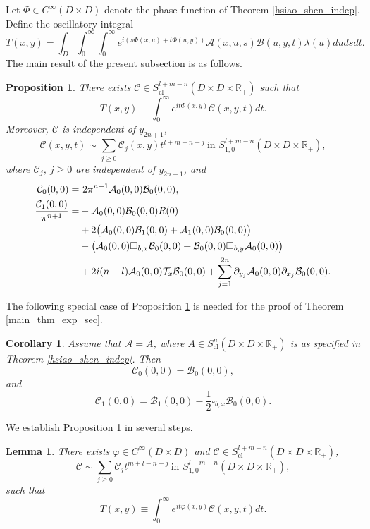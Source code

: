 \documentclass{article}
\newtheorem{lemma}[theorem]{Lemma}
\newtheorem{corollary}[theorem]{Corollary}
\newtheorem{proposition}[theorem]{Proposition}
\newcommand{\RR}{\mathbb R}
\newcommand{\mca}{\mathcal A}
\newcommand{\mcb}{\mathcal B}
\newcommand{\mcc}{\mathcal C}
\newcommand{\mct}{\mathcal T}
\DeclareMathOperator{\cl}{cl}
\begin{document}
Let $\Phi \in C^\infty(D \times D)$ denote the phase function of Theorem \ref{hsiao_shen_indep}. Define the oscillatory integral $$T(x,y) = \int_D \int_0^\infty \int_0^\infty e^{i(s \Phi(x,u) + t \Phi(u, y))} \mca(x,u, s) \mcb(u, y, t) \lambda(u) du ds dt.$$
The main result of the present subsection is as follows.
%
\begin{proposition}\label{product_expansion} There exists $\mcc \in S^{l+m-n}_{\cl}(D \times D \times \RR_+)$ such that $$T(x,y) \equiv \int_0^\infty e^{it \Phi(x,y)} \mcc(x,y,t)dt.$$
Moreover, $\mcc$ is independent of $y_{2n+1}$,
$$\mcc(x,y,t) \sim \sum_{j \ge 0} \mcc_j(x,y) t^{l+m-n-j}\ \text{in } S^{l+m-n}_{1,0}(D \times D \times \RR_+),$$
where $\mcc_j$, $j \ge 0$ are independent of $y_{2n+1}$, and
%
\begin{equation}\label{gen_C0C1}\begin{aligned} \mcc_0(0,0) = &\ 2\pi^{n+1} \mca_0(0,0) \mcb_0(0,0),\\ \frac{\mcc_1(0,0)}{\pi^{n+1}} = &- \mca_0(0,0) \mcb_0(0,0) R(0)\\ & + 2\big{(}\mca_0(0,0) \mcb_1(0,0) + \mca_1(0,0) \mcb_0(0,0) \big{)}\\ & -\big{(}\mca_0(0,0) \square_{b,x} \mcb_0(0,0) + \mcb_0(0,0) \square_{b,y} \mca_0(0,0)\big{)}\\ &+2i(n-l) \mca_0(0,0)\mct_x \mcb_0(0,0) + \sum_{j=1}^{2n} \partial_{y_j} \mca_0(0,0) \partial_{x_j} \mcb_0(0,0). \end{aligned}\end{equation}\end{proposition}
%
The following special case of Proposition \ref{product_expansion} is needed for the proof of Theorem \ref{main_thm_exp_sec}.
%
\begin{corollary}\label{toeplitz_exp} Assume that $\mca = A$, where $A \in S^n_{\cl}(D \times D \times \RR_+)$ is as specified in Theorem \ref{hsiao_shen_indep}. Then$$\mcc_0(0,0) = \mcb_0(0,0),$$
and $$\mcc_1(0,0) = \mcb_1(0,0)  -\frac 1 2 \square_{b,x} \mcb_0(0,0).$$ \end{corollary}
%
We establish Proposition \ref{product_expansion} in several steps.
%
\begin{lemma}\label{basic_formula} There exists $\varphi \in C^\infty(D \times D)$ and $\mcc \in S^{l+m-n}_{\cl}(D \times D \times \RR_+)$, $$\mcc \sim \sum_{j \ge 0} \mcc_j t^{m+l-n-j}\ \text{in } S^{l+m-n}_{1,0}(D \times D \times \RR_+),$$ such that $$T(x,y) \equiv \int_0^\infty e^{it \varphi(x,y)} \mcc(x,y,t) dt.$$\end{lemma}
%
\end{document}
